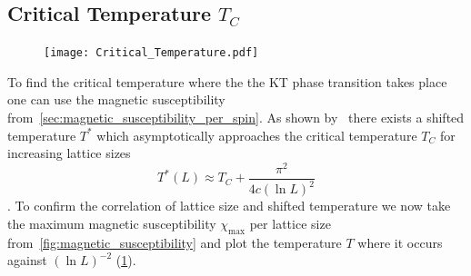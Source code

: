 \subsection{Critical Temperature \texorpdfstring{$T_C$}{T}}\label{sec:critical_temperature}
\begin{figure}[H]
	\centering
	\texttt{[image: Critical\_Temperature.pdf]}
	\caption[Obtaining the critical temperature $\texorpdfstring{T_C}{T}$ by plotting the temperature $\texorpdfstring{T}{T}$ at $\texorpdfstring{\chi_\text{max}}{the magnetic susceptibility is maximum}$ against $\texorpdfstring{(\ln{L})^{-2}}{inverse logarithmic squared lattice size}$]{}
	\label{fig:critical_temperature}
\end{figure}
To find the critical temperature where the the KT phase transition takes place one can use the magnetic susceptibility from~\cref{sec:magnetic_susceptibility_per_spin}. As shown by~\citet{shifted} there exists a shifted temperature $T^*$ which asymptotically approaches the critical temperature $T_C$ for increasing lattice sizes
\begin{equation}\label{eq:shifted_temperature}
	T^*(L) \approx T_C + \frac{\pi^2}{4c (\ln{L})^2}
\end{equation}
\cite[eq. 3]{shifted}. To confirm the correlation of lattice size and shifted temperature we now take the maximum magnetic susceptibility $\chi_\text{max}$ per lattice size from~\cref{fig:magnetic_susceptibility} and plot the temperature $T$ where it occurs against $(\ln{L})^{-2}$ (\cref{fig:critical_temperature}).

